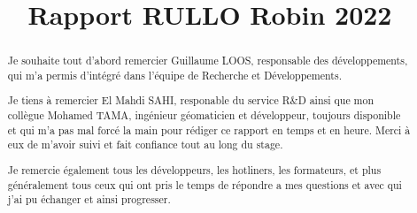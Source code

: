 \documentclass{rapportUHA40}
\title{Rapport RULLO Robin 2022} %
\begin{document}









\fairepagedegarde%
\fairemarges%



\begin{center}
  \begin{abstract}
    Je souhaite tout d’abord remercier Guillaume LOOS, responsable des
    développements, qui m'a permis d'intégré dans l'équipe de Recherche et Développements.
    \vspace{1cm}

    Je tiens à remercier El Mahdi SAHI, responable du service R\&D ainsi que mon
    collègue Mohamed TAMA, ingénieur géomaticien et développeur, toujours
    disponible et qui m'a pas mal forcé la main pour rédiger ce rapport en temps et
    en heure. Merci à eux de m’avoir suivi et fait confiance tout au long du stage.
    \vspace{1cm}

    Je remercie également tous les développeurs, les hotliners, les formateurs, et
    plus généralement tous ceux qui ont pris le temps de répondre a mes questions
    et avec qui j'ai pu échanger et ainsi progresser.
  \end{abstract}
\end{center}
\newpage
\end{document}

